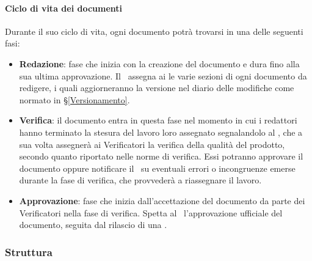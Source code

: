 			\paragraph{Ciclo di vita dei documenti}\label{PS:Documentazione:Implementazione:CicloVita}
			Durante il suo ciclo di vita, ogni documento potrà trovarsi in una delle seguenti fasi:
			\begin{itemize}
				\item \textbf{Redazione}: fase che inizia con la creazione del documento e dura fino alla sua ultima approvazione.
					Il \Res\ assegna ai  le varie sezioni di ogni documento da redigere, i quali aggiorneranno la versione nel diario delle modifiche
					come normato in \S\ref{Versionamento}.
				\item \textbf{Verifica}: il documento entra in questa fase nel momento in cui i redattori hanno terminato la stesura del lavoro loro assegnato
					segnalandolo al \Res, che a sua volta assegnerà ai Verificatori la verifica della qualità del prodotto, secondo quanto riportato nelle norme di verifica.
					Essi potranno approvare il documento oppure notificare il \Res\ su eventuali errori o incongruenze emerse durante la fase di verifica, che provvederà
					a riassegnare il lavoro.
				\item \textbf{Approvazione}: fase che inizia dall'accettazione del documento da parte dei Verificatori nella fase di verifica. Spetta al \Res\
					l'approvazione ufficiale del documento, seguita dal rilascio di una .
			\end{itemize}

		\subsubsection{Struttura}\label{PS:Documentazione:Struttura}

